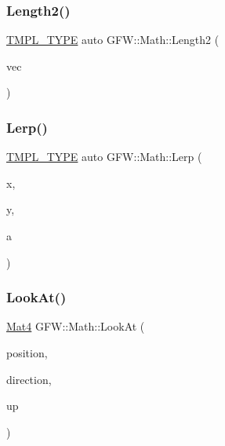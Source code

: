 \mbox{\label{namespace_g_f_w_1_1_math_a3d3542b2ef8f7c3b5edf3328b5a9259f}} 
\subsubsection{\texorpdfstring{Length2()}{Length2()}}
{\footnotesize\ttfamily \hyperlink{_math_8h_a2618808fbb8e74983f8aaea56d02752b}{T\+M\+P\+L\+\_\+\+T\+Y\+PE} auto G\+F\+W\+::\+Math\+::\+Length2 (\begin{DoxyParamCaption}\item[{const type \&}]{vec }\end{DoxyParamCaption})}

\mbox{\label{namespace_g_f_w_1_1_math_a12b20a8879ba0442a79dd969e17783c2}} 
\subsubsection{\texorpdfstring{Lerp()}{Lerp()}}
{\footnotesize\ttfamily \hyperlink{_math_8h_a2618808fbb8e74983f8aaea56d02752b}{T\+M\+P\+L\+\_\+\+T\+Y\+PE} auto G\+F\+W\+::\+Math\+::\+Lerp (\begin{DoxyParamCaption}\item[{const type \&}]{x,  }\item[{const type \&}]{y,  }\item[{const type \&}]{a }\end{DoxyParamCaption})}

\mbox{\label{namespace_g_f_w_1_1_math_a049c747ba5e17c0b0cd66f68ea1001d7}} 
\subsubsection{\texorpdfstring{Look\+At()}{LookAt()}}
{\footnotesize\ttfamily \hyperlink{namespace_g_f_w_1_1_math_a313d630ab7d0ef3b109bb39401962fb1}{Mat4} G\+F\+W\+::\+Math\+::\+Look\+At (\begin{DoxyParamCaption}\item[{const \hyperlink{namespace_g_f_w_1_1_math_a3c3a254de27c8bbb8434611ce231c378}{Vec3} \&}]{position,  }\item[{const \hyperlink{namespace_g_f_w_1_1_math_a3c3a254de27c8bbb8434611ce231c378}{Vec3} \&}]{direction,  }\item[{const \hyperlink{namespace_g_f_w_1_1_math_a3c3a254de27c8bbb8434611ce231c378}{Vec3} \&}]{up }\end{DoxyParamCaption})\hspace{0.3cm}{\ttfamily [inline]}}

